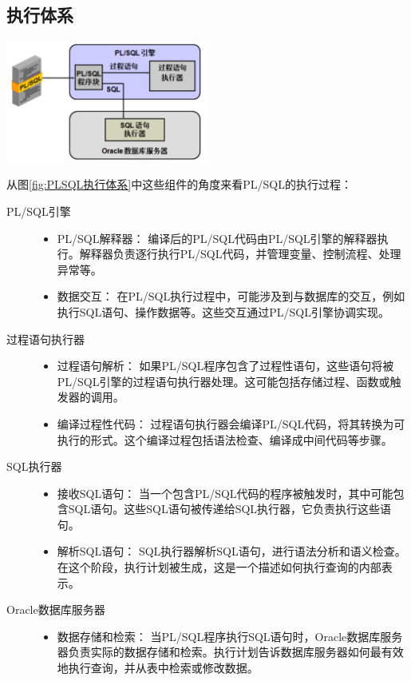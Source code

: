 \documentclass[11pt, a4paper, oneside, UTF8]{ctexbook}
\begin{document}
\subsection{执行体系}
\begin{center}
  \begin{minipage}{\textwidth}
    \center
    \includegraphics[width=0.5\textwidth]{picture/PLSQL执行体系.png}
    \captionsetup{hypcap=false}
    \label{fig:PLSQL执行体系}
  \end{minipage}
\end{center}
从图\ref{fig:PLSQL执行体系}中这些组件的角度来看PL/SQL的执行过程：
\begin{description}
  \item[PL/SQL引擎] \hfill
  \begin{itemize}
    \item PL/SQL解释器： 编译后的PL/SQL代码由PL/SQL引擎的解释器执行。解释器负责逐行执行PL/SQL代码，并管理变量、控制流程、处理异常等。
    \item 数据交互： 在PL/SQL执行过程中，可能涉及到与数据库的交互，例如执行SQL语句、操作数据等。这些交互通过PL/SQL引擎协调实现。
  \end{itemize}
  \item[过程语句执行器] \hfill
  \begin{itemize}
    \item 过程语句解析： 如果PL/SQL程序包含了过程性语句，这些语句将被PL/SQL引擎的过程语句执行器处理。这可能包括存储过程、函数或触发器的调用。
    \item 编译过程性代码： 过程语句执行器会编译PL/SQL代码，将其转换为可执行的形式。这个编译过程包括语法检查、编译成中间代码等步骤。
  \end{itemize}
  \item[SQL执行器]  \hfill
  \begin{itemize}
    \item 接收SQL语句： 当一个包含PL/SQL代码的程序被触发时，其中可能包含SQL语句。这些SQL语句被传递给SQL执行器，它负责执行这些语句。
    \item 解析SQL语句： SQL执行器解析SQL语句，进行语法分析和语义检查。在这个阶段，执行计划被生成，这是一个描述如何执行查询的内部表示。
  \end{itemize}
  \item[Oracle数据库服务器] \hfill
  \begin{itemize}
    \item 数据存储和检索： 当PL/SQL程序执行SQL语句时，Oracle数据库服务器负责实际的数据存储和检索。执行计划告诉数据库服务器如何最有效地执行查询，并从表中检索或修改数据。
  \end{itemize}
\end{description}
\end{document}

